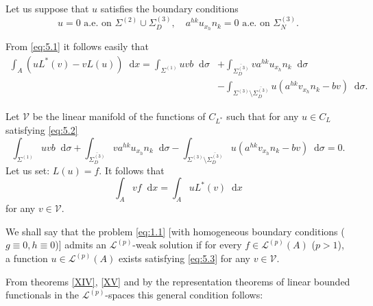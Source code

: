 \documentclass[a4paper,12pt,leqno]{article}
\numberwithin{equation}{section}
\newcommand{\dd}{\mathop{}\!\mathrm{d}}
\begin{document}
Let us suppose that $u$ satisfies the boundary conditions
\begin{equation}
	\label{eq:5.2}
	u = 0 \text{ a.e.\ on } \Sigma^{(2)} \cup \Sigma^{(3)}_D,
	\quad 
	a^{hk} u_{x_h} n_k = 0 \text{ a.e.\ on } \Sigma^{(3)}_N.
\end{equation}

From \eqref{eq:5.1} it follows easily that
\begin{equation*}
	\begin{split}
		\int_{A} (u L^*(v)-v L(u)) \dd x
		=
		\int_{\Sigma^{(1)}} u v b \dd \sigma
		& + 
		\int_{\overline{\Sigma^{(3)}_D}} v a^{h k} u_{x_{h}} n_{k} \dd \sigma \\
		& -
		\int_{\Sigma^{(3)} \setminus \overline{\Sigma^{(3)}_D}} u (a^{h k} v_{x_{h}} n_{k}-bv) \dd \sigma.
	\end{split}
\end{equation*}

Let $\mathscr{V}$ be the linear manifold of the functions of $C_{L^*}$ such that for any $u \in C_{L}$ satisfying \eqref{eq:5.2}
\begin{equation*}
		\int_{\Sigma^{(1)}} u v b \dd \sigma
	+ 
	\int_{\overline{\Sigma^{(3)}_D}} v a^{h k} u_{x_{h}} n_{k} \dd \sigma
	-
	\int_{\Sigma^{(3)} \setminus \overline{\Sigma^{(3)}_D}} u (a^{h k} v_{x_{h}} n_{k}-bv) \dd \sigma
	= 0.
\end{equation*}
Let us set: $L(u)=f$. It follows that
\begin{equation}
	\label{eq:5.3}
	\int_{A} v f \dd x=\int_{A} u L^{*}(v) \dd x
\end{equation}
for any $v \in \mathscr{V}$.

We shall say that the problem \eqref{eq:1.1} [with homogeneous boundary conditions ($g\equiv0, h\equiv0$)] admits an $\mathscr{L}^{(p)}$-weak solution if for every $f \in \mathscr{L}^{(p)}(A)$ ($p > 1$), a function $u \in \mathscr{L}^{(p)}(A)$ exists satisfying \eqref{eq:5.3} for any $v \in \mathscr{V}$.


From theorems \ref{XIV}, \ref{XV} and by the representation theorems of linear bounded functionals in the $\mathscr{L}^{(p)}$-spaces this general condition follows:
\end{document}
